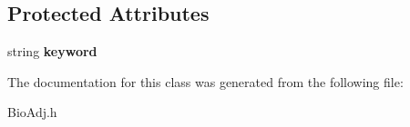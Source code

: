 \subsection*{Protected Attributes}
\begin{DoxyCompactItemize}
\item 
\mbox{\label{class_bio_adj_ae86137508fe8e374f845c85b0c796d76}} 
string {\bfseries keyword}
\end{DoxyCompactItemize}


The documentation for this class was generated from the following file\+:\begin{DoxyCompactItemize}
\item 
Bio\+Adj.\+h\end{DoxyCompactItemize}
